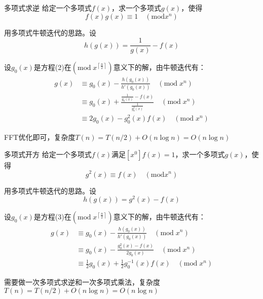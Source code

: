 \documentclass{beamer}
\begin{document}
\begin{frame}{多项式求逆}
    \small
    给定一个多项式$f(x)$，求一个多项式$g(x)$，使得
    \begin{equation}
        f(x)g(x) \equiv 1 \quad (\text{mod} x^n)
    \end{equation}

    \vspace{1em}\pause
    用多项式牛顿迭代的思路。设
    \begin{equation*}
        h(g(x))=\frac{1}{g(x)}-f(x)
    \end{equation*}

    \pause
    设$g_0(x)$是方程(2)在$(\text{mod}\;x^{\left\lceil\frac{n}{2}\right\rceil})$意义下的解，由牛顿迭代有：
    \begin{align*}
        g(x)&\equiv g_0(x) -\frac{h(g_0(x))}{h'(g_0(x))} \quad (\text{mod}\;x^n)\\
        &\equiv g_0(x) +\frac{\frac{1}{g_0(x)}-f(x)}{\frac{1}{g_0^2(x)}} \quad (\text{mod}\;x^n)\\
        &\equiv 2g_0(x)-g_0^2(x)f(x)\quad (\text{mod}\;x^n)
    \end{align*}

    FFT优化即可，复杂度$T(n)=T(n/2)+O(n\log n)=O(n\log n)$
\end{frame}

\begin{frame}{多项式开方}
    \small
    给定一个多项式$f(x)$满足$[x^0]f(x)=1$，求一个多项式$g(x)$，使得
    \begin{equation}
        g^2(x) \equiv f(x) \quad (\text{mod} x^n)
    \end{equation}
    
    \vspace{1em}\pause
    用多项式牛顿迭代的思路。设
    \begin{equation*}
        h(g(x))=g^2(x)-f(x)
    \end{equation*}

    \pause
    设$g_0(x)$是方程(3)在$(\text{mod}\;x^{\left\lceil\frac{n}{2}\right\rceil})$意义下的解，由牛顿迭代有：
    \begin{align*}
        g(x)&\equiv g_0(x) -\frac{h(g_0(x))}{h'(g_0(x))} \quad (\text{mod}\;x^n)\\
        &\equiv g_0(x) -\frac{g_0^2(x)-f(x)}{2g_0(x)} \quad (\text{mod}\;x^n)\\
        &\equiv \frac{1}{2}g_0(x)+\frac{1}{2}g_0^{-1}(x)f(x)\quad (\text{mod}\;x^n)
    \end{align*}

    需要做一次多项式求逆和一次多项式乘法，复杂度$T(n)=T(n/2)+O(n\log n)=O(n\log n)$
\end{frame}
\end{document}

